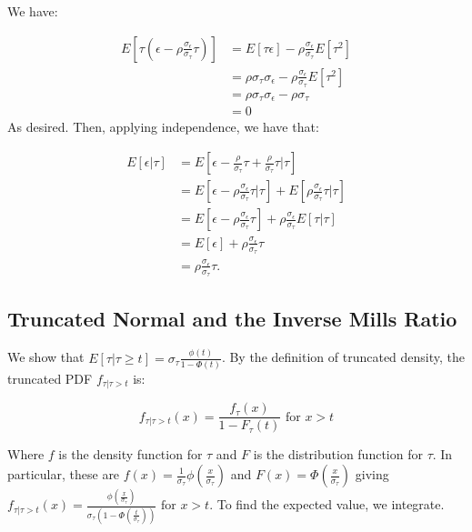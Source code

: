 \documentclass[12pt,twoside]{reedthesis}
\theoremstyle{definition}
\begin{document}
We have:

\begin{align*}
E[\tau (\epsilon - \rho \frac{\sigma_\epsilon}{\sigma_\tau} \tau)] &= E[\tau \epsilon] -  \rho \frac{\sigma_\epsilon}{\sigma_\tau} E[\tau^2] \\
&=  \rho \sigma_\tau \sigma_\epsilon -  \rho \frac{\sigma_\epsilon}{\sigma_\tau}E[\tau^2] \\ 
&= \rho \sigma_\tau \sigma_\epsilon -  \rho \sigma_\tau \\
&= 0
\end{align*}
As desired. Then, applying independence, we have that:

\begin{align*}
E[\epsilon | \tau] &= E[\epsilon - \frac{\rho}{\sigma_\tau} \tau +  \frac{\rho}{\sigma_\tau} \tau | \tau] \\
&= E[\epsilon - \rho \frac{\sigma_\epsilon}{\sigma_\tau} \tau | \tau] + E[\rho \frac{\sigma_\epsilon}{\sigma_\tau} \tau | \tau] \\
&= E[\epsilon - \rho \frac{\sigma_\epsilon}{\sigma_\tau} \tau] +\rho \frac{\sigma_\epsilon}{\sigma_\tau}E[\tau | \tau] \\
&= E[\epsilon] + \rho \frac{\sigma_\epsilon}{\sigma_\tau} \tau \\
&= \rho \frac{\sigma_\epsilon}{\sigma_\tau} \tau. 
\end{align*}

\subsection{Truncated Normal and the Inverse Mills Ratio}

We show that $E[\tau | \tau \geq t] = \sigma_\tau \frac{\phi(t)}{1 - \Phi(t)}$. By the definition of truncated density, the truncated PDF $f_{\tau | \tau > t}$ is:

$$f_{\tau | \tau > t}(x) = \frac{f_\tau(x)}{1 - F_\tau(t)} \text{  for } x > t$$

Where $f$ is the density function for $\tau$ and $F$ is the distribution function for $\tau$. In particular, these are $f(x) = \frac{1}{\sigma_\tau} \phi(\frac{x}{\sigma_\tau})$ and $F(x) = \Phi(\frac{x}{\sigma_\tau})$ giving $f_{\tau | \tau > t}(x) = \frac{\phi(\frac{x}{\sigma_\tau})}{\sigma_\tau(1 - \Phi(\frac{t}{\sigma_\tau}))} \text{  for } x > t$. To find the expected value, we integrate. 
\end{document}
